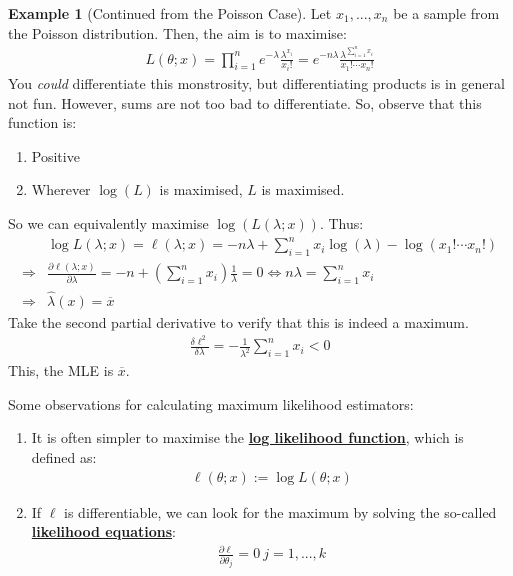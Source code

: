 \documentclass[11pt]{scrartcl}
\theoremstyle{definition}
\newtheorem{ex}{Example}
\theoremstyle{remark}
\newcommand{\dfn}[1]{\textbf{\underline{#1}}}
\begin{document}
{\begin{ex}[Continued from the Poisson Case] Let $x_1, ..., x_n$ be a sample from the Poisson distribution. Then, the aim is to maximise: 
	\begin{align*}
		L(\theta; x ) = \prod_{i=1}^n e^{-\lambda} \frac{\lambda^{x_i}}{x_i!}	= e^{-n\lambda} \frac{\lambda^{\sum_{i=1}^n x_i}}{x_1! \cdots x_n!}
	\end{align*}
	You \emph{could} differentiate this monstrosity, but differentiating products is in general not fun. However, sums are not too bad to differentiate. So, observe that this function is:
	\begin{enumerate}[noitemsep]
		\item Positive
		\item Wherever $\log(L)$ is maximised, $L$ is maximised. 
	\end{enumerate}
	So we can equivalently maximise $\log(L(\lambda; x))$. Thus: 
	\begin{align*}
		& \log L(\lambda; x)  = \ell(\lambda; x) = -n \lambda + \sum_{i=1}^n x_i \log(\lambda) - \log(x_1! \cdots x_n! ) 	\\
		\Rightarrow & \frac{\partial \ell(\lambda; x)}{\partial \lambda} = -n + \left( \sum_{i=1}^n x_i \right) \frac{1}{\lambda} = 0 \iff n \lambda = \sum_{i=1}^n x_i \\
		\Rightarrow & \hat{\lambda}(x) = \overline{x} 
	\end{align*}
	Take the second partial derivative to verify that this is indeed a maximum. 
	\begin{align*}
		\frac{\delta \ell^2}{\delta \lambda} = - \frac{1}{\lambda^2} \sum_{i=1}^n x_i < 0 	
	\end{align*}
	This, the MLE is $\overline{x}$. 
\end{ex}
Some observations for calculating maximum likelihood estimators: 
\begin{enumerate}[noitemsep]
	\item It is often simpler to maximise the \dfn{log likelihood function}, which is defined as: 
	\begin{align}
		\ell(\theta; x) := \log L(\theta; x) 
	\end{align}
	\item If $\ell$ is differentiable, we can look for the maximum by solving the so-called \dfn{likelihood equations}: 
	\begin{align}
		\frac{\partial \ell}{\partial \theta_j} = 0\ j=1,..., k
	\end{align}
\end{enumerate}

}
\end{document}
